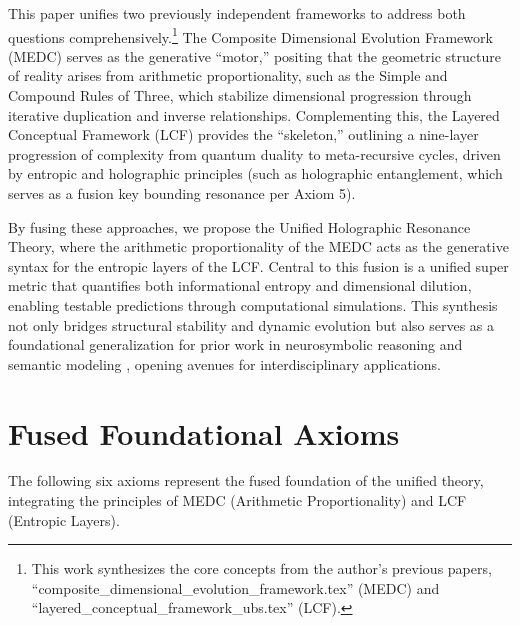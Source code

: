 \documentclass[11pt, a4paper]{article}
\begin{document}
		This paper unifies two previously independent frameworks to address both questions comprehensively.\footnote{This work synthesizes the core concepts from the author's previous papers, ``composite\_dimensional\_evolution\_framework.tex'' (MEDC) and ``layered\_conceptual\_framework\_ubs.tex'' (LCF).} The Composite Dimensional Evolution Framework (MEDC) serves as the generative ``motor,'' positing that the geometric structure of reality arises from arithmetic proportionality, such as the Simple and Compound Rules of Three, which stabilize dimensional progression through iterative duplication and inverse relationships. Complementing this, the Layered Conceptual Framework (LCF) provides the ``skeleton,'' outlining a nine-layer progression of complexity from quantum duality to meta-recursive cycles, driven by entropic and holographic principles (such as holographic entanglement, which serves as a fusion key bounding resonance per Axiom 5).
		
		By fusing these approaches, we propose the Unified Holographic Resonance Theory, where the arithmetic proportionality of the MEDC acts as the generative syntax for the entropic layers of the LCF. Central to this fusion is a unified super metric that quantifies both informational entropy and dimensional dilution, enabling testable predictions through computational simulations. This synthesis not only bridges structural stability and dynamic evolution but also serves as a foundational generalization for prior work in neurosymbolic reasoning \cite{Triadic} and semantic modeling \cite{BUSS}, opening avenues for interdisciplinary applications.
		
		\section{Fused Foundational Axioms}
		
		The following six axioms represent the fused foundation of the unified theory, integrating the principles of MEDC (Arithmetic Proportionality) and LCF (Entropic Layers).
		
\end{document}

